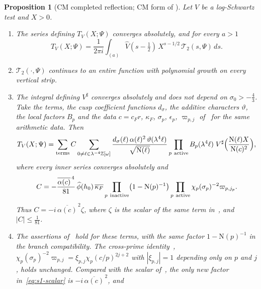 \documentclass[11pt]{article}
\numberwithin{equation}{section}
\newcommand{\OO}{\mathbb Z[\omega]}
\newcommand{\N}{\mathrm N}
\newtheorem{proposition}{Proposition}
\begin{document}
\begin{proposition}[CM completed reflection; CM form of {\cite[Prop.~5.1]{OAI78}}]
\label{prop:s1-reflection}
Let $V$ be a log-Schwartz test and $X>0$.
\begin{enumerate}
\item[(a)] The series defining $T_V(X;\Psi)$ converges absolutely, and for every $a>1$
 \begin{equation}\label{eq:d127}
  T_V(X;\Psi)=\frac1{2\pi i}\int_{(a)}\widehat V(s-\tfrac12)\,X^{s-1/2}\,\mathcal T_2(s,\Psi)\,ds .
 \end{equation}
\item[(b)] $\mathcal T_2(\cdot,\Psi)$ continues to an entire function with polynomial growth on every vertical
 strip.
\item[(c)] The integral defining $V^\sharp$ converges absolutely and does not depend on $\sigma_0>-\frac43$. Take the
 terms, the cusp coefficient functions $d_\sigma$, the additive characters $\vartheta$, the local factors $B_p$ and the
 data $c=c_Fr$, $\kappa_F$, $\sigma_p$, $\epsilon_p$, $\varpi_{p,j}$ of~\cite[Prop.~5.1, items~(1)--(3)]{OAI78} for the same arithmetic data. Then
 \begin{equation}\label{eq:s1-reflection}
  T_V(X;\Psi)=\sum_{\rm terms}C\sum_{0\ne\ell\in\lambda^{-4}\OO}
  \frac{d_\sigma(\ell)\,\alpha(\ell)^2\,\vartheta(\lambda^4\ell)}{\sqrt{\N(\ell)}}
  \prod_{p\ {\rm active}}B_p(\lambda^4\ell)\;V^\sharp\Bigl(\frac{\N(\ell)X}{\N(c)^2}\Bigr),
 \end{equation}
 where every inner series converges absolutely and
 \begin{equation}\label{eq:s1-scalar}
  C=-\frac{\overline{\alpha(c)}^{\,4}}{81}\,\widehat\phi(h_0)\,\overline{\kappa_F}
  \prod_{p\ {\rm inactive}}\bigl(1-\N(p)^{-1}\bigr)\prod_{p\ {\rm active}}\chi_p(\sigma_p)^{-2}\varpi_{p,j_p}.
 \end{equation}
 Thus $C=-i\,\overline{\alpha(c)}^{\,2}\zeta$, where $\zeta$ is the scalar of the same term
 in~\cite[eq.~(5.3)]{OAI78}, and $|C|\le\frac1{81}$.
\item[(d)] The assertions of~\cite[Proposition~5.1, item~(3)]{OAI78} hold for these terms, with the same factor
 $1-\N(p)^{-1}$ in the branch compatibility. The cross-prime identity~\cite[eq.~(5.17)]{OAI78},
 $\chi_p(\sigma_p)^{-2}\varpi_{p,j}=\xi_{p,j}\chi_p(c/p)^{2j+2}$ with $|\xi_{p,j}|=1$ depending only on $p$ and $j$,
 holds unchanged. Compared with the scalar of~\cite{OAI78}, the only new factor in~\eqref{eq:s1-scalar} is
 $-i\,\overline{\alpha(c)}^{\,2}$, and

\end{enumerate}
\end{proposition}
\end{document}
